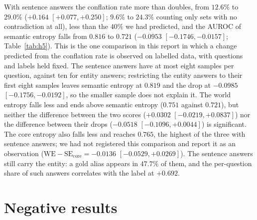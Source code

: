\documentclass[english]{desafiokunumi}
\theoremstyle{definition}
\theoremstyle{remark}
\newcommand{\SEc}{\mathrm{SE}_{\mathrm{core}}}
\newcommand{\WE}{\mathrm{WE}}
\begin{document}
With sentence answers the conflation rate more than doubles, from $12.6\%$ to
$29.0\%$ ($+0.164$ $[+0.077, +0.250]$; $9.6\%$ to $24.3\%$ counting only sets
with no contradiction at all), less than the $40\%$ we had predicted, and the
AUROC of semantic entropy falls from $0.816$ to $0.721$ ($-0.0953$
$[-0.1746, -0.0157]$; Table~\ref{tab:h5}). This is the one comparison in this
report in which a change predicted from the conflation rate is observed on
labelled data, with questions and labels held fixed. The sentence answers
have at most eight samples per question, against ten for entity answers;
restricting the entity answers to their first eight samples leaves semantic
entropy at $0.819$ and the drop at $-0.0985$ $[-0.1756, -0.0192]$, so the
smaller sample does not explain it. The world entropy falls less and ends
above semantic entropy ($0.751$ against $0.721$), but neither the difference
between the two scores ($+0.0302$ $[-0.0219, +0.0837]$) nor the difference
between their drops ($-0.0518$ $[-0.1096, +0.0044]$) is significant. The core
entropy also falls less and reaches $0.765$, the highest of the three with
sentence answers; we had not registered this comparison and report it as an
observation ($\WE - \SEc = -0.0136$ $[-0.0529, +0.0269]$). The sentence
answers still carry the entity: a gold alias appears in $47.7\%$ of them, and
the per-question share of such answers correlates with the label at $+0.692$.

\section{Negative results}
\label{sec:neg}
\end{document}

